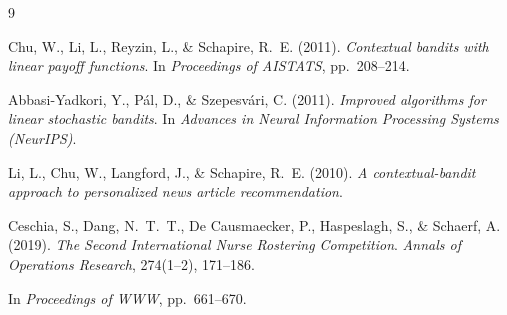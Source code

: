\documentclass[11pt]{article}
\begin{document}

\begin{thebibliography}{9}

Chu, W., Li, L., Reyzin, L., \& Schapire, R.~E. (2011).
\textit{Contextual bandits with linear payoff functions}.
In \textit{Proceedings of AISTATS}, pp.~208--214.

Abbasi-Yadkori, Y., P{\'a}l, D., \& Szepesv{\'a}ri, C. (2011).
\textit{Improved algorithms for linear stochastic bandits}.
In \textit{Advances in Neural Information Processing Systems (NeurIPS)}.

Li, L., Chu, W., Langford, J., \& Schapire, R.~E. (2010).
\textit{A contextual-bandit approach to personalized news article recommendation}.

Ceschia, S., Dang, N.~T.~T., De Causmaecker, P., Haspeslagh, S.,
\& Schaerf, A. (2019).
\textit{The Second International Nurse Rostering Competition}.
\textit{Annals of Operations Research}, 274(1--2), 171--186.


In \textit{Proceedings of WWW}, pp.~661--670.



\end{thebibliography}
\end{document}
